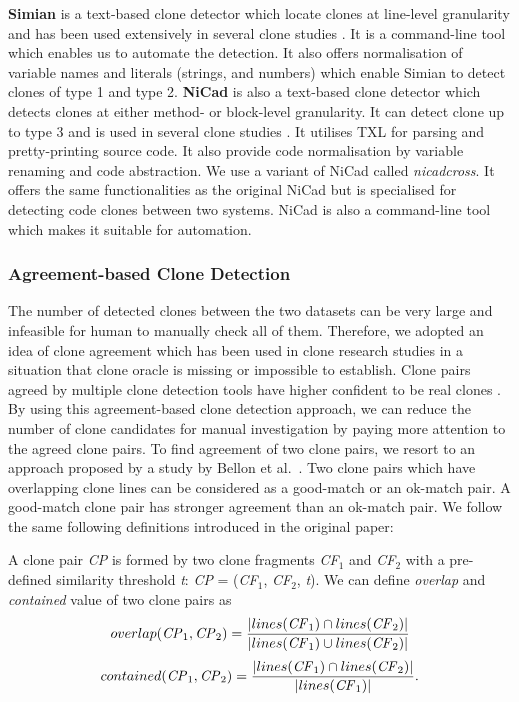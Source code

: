 \documentclass{sig-alternate-05-2015}
\newcommand{\squeezeup}{\vspace{-0.5mm}}
\begin{document}
\textbf{Simian} is a text-based clone detector which locate clones at line-level granularity and has been used extensively in several clone studies \cite{Ragkhitwetsagul2016, Wang2013, Mondal2011, Cheung2015, Krinke2010}. It is a command-line tool which enables us to automate the detection. It also offers normalisation of variable names and literals (strings, and numbers) which enable Simian to detect clones of type 1 and type 2. \textbf{NiCad} is also a text-based clone detector which detects clones at either method- or block-level granularity. It can detect clone up to type 3 and is used in several clone studies \cite{Roy2008, Ragkhitwetsagul2016, Svajlenko2014, Wang2013, Mondal2011, Sajnani2016}. It utilises TXL for parsing and pretty-printing source code. It also provide code normalisation by variable renaming and code abstraction. We use a variant of NiCad called \textit{nicadcross}. It offers the same functionalities as the original NiCad but is specialised for detecting code clones between two systems. NiCad is also a command-line tool which makes it suitable for automation.

\subsubsection{Agreement-based Clone Detection}
The number of detected clones between the two datasets can be very large and infeasible for human to manually check all of them. Therefore, we adopted an idea of clone agreement which has been used in clone research studies \cite{Wang2013,Funaro2010,cr2016ssbse} in a situation that clone oracle is missing or impossible to establish. Clone pairs agreed by multiple clone detection tools have higher confident to be real clones \cite{cr2016ssbse}. By using this agreement-based clone detection approach, we can reduce the number of clone candidates for manual investigation by paying more attention to the agreed clone pairs. To find agreement of two clone pairs, we resort to an approach proposed by a study by Bellon et al.~\cite{Bellon2007}. Two clone pairs which have overlapping clone lines can be considered as a good-match or an ok-match pair. A good-match clone pair has stronger agreement than an ok-match pair. We follow the same following definitions introduced in the original paper:

A clone pair \textit{CP} is formed by two clone fragments \textit{CF$_1$} and \textit{CF$_2$} with a pre-defined similarity threshold \textit{t}: \textit{CP} = (\textit{CF$_1$}, \textit{CF$_2$}, \textit{t}).  We can define \textit{overlap} and \textit{contained} value of two clone pairs as 
\begin{multline}
	overlap(\textrm{\textit{CP}}_1, \textrm{\textit{CP}}_2) = \frac{|lines(\textrm{\textit{CF}}_1) \cap lines(\textrm{\textit{CF}}_2)|}{|lines(\textrm{\textit{CF}}_1) \cup lines(\textrm{\textit{CF}}_2)|} 
\end{multline}
\begin{multline}
	contained(\textrm{\textit{CP}}_1, \textrm{\textit{CP}}_2) = \frac{|lines(\textrm{\textit{CF}}_1) \cap lines(\textrm{\textit{CF}}_2)|}{|lines(\textrm{\textit{CF}}_1)|}. 
\end{multline}
\end{document}
